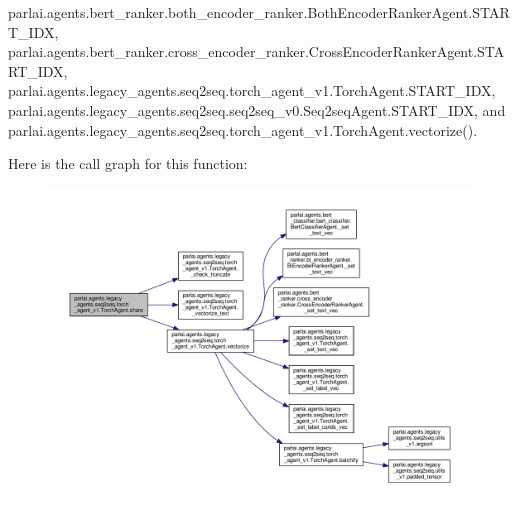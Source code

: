 parlai.\+agents.\+bert\+\_\+ranker.\+both\+\_\+encoder\+\_\+ranker.\+Both\+Encoder\+Ranker\+Agent.\+S\+T\+A\+R\+T\+\_\+\+I\+DX, parlai.\+agents.\+bert\+\_\+ranker.\+cross\+\_\+encoder\+\_\+ranker.\+Cross\+Encoder\+Ranker\+Agent.\+S\+T\+A\+R\+T\+\_\+\+I\+DX, parlai.\+agents.\+legacy\+\_\+agents.\+seq2seq.\+torch\+\_\+agent\+\_\+v1.\+Torch\+Agent.\+S\+T\+A\+R\+T\+\_\+\+I\+DX, parlai.\+agents.\+legacy\+\_\+agents.\+seq2seq.\+seq2seq\+\_\+v0.\+Seq2seq\+Agent.\+S\+T\+A\+R\+T\+\_\+\+I\+DX, and parlai.\+agents.\+legacy\+\_\+agents.\+seq2seq.\+torch\+\_\+agent\+\_\+v1.\+Torch\+Agent.\+vectorize().

Here is the call graph for this function\+:
\nopagebreak
\begin{figure}[H]
\begin{center}
\leavevmode
\includegraphics[width=350pt]{classparlai_1_1agents_1_1legacy__agents_1_1seq2seq_1_1torch__agent__v1_1_1TorchAgent_a3d922c4a8452c9e44fa2478e6fecdfd1_cgraph}
\end{center}
\end{figure}
\mbox{\label{classparlai_1_1agents_1_1legacy__agents_1_1seq2seq_1_1torch__agent__v1_1_1TorchAgent_aff9cc5c105bbf154075aa83e288582ca}} 
